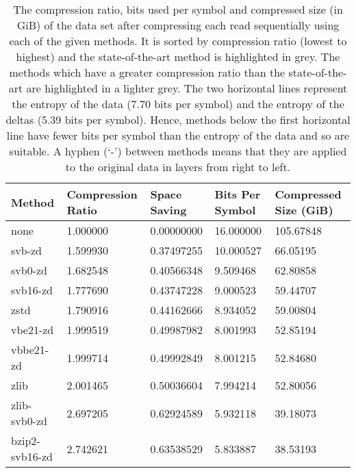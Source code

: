 \begin{table}
	\caption[The compression ratio, bits used per
	symbol and compressed size (in GiB) of the data set after compressing
	each read sequentially using each of the given methods.]{\label{tab:results-space} The compression ratio, bits used per
	symbol and compressed size (in GiB) of the data set after compressing
	each read sequentially using each of the given methods. It is
	sorted by compression ratio (lowest to highest) and the state-of-the-art method is
	highlighted in grey.
	The methods which have a greater compression ratio than the
	state-of-the-art are highlighted in a lighter grey.
	The two horizontal lines represent the entropy of
	the data (7.70 bits per symbol) and the entropy of the deltas (5.39
	bits per symbol). Hence, methods below the first horizontal line have
	fewer bits per symbol than the entropy of the data and so are suitable.
	A hyphen (`-') between methods means that they are applied to the
	original data in layers from right to left.}
	\begin{tabular}{|l|l|l|l|l|}
	    \hline
		Method & Compression Ratio & Space Saving & Bits Per Symbol & Compressed Size (GiB) \\
\hline
               none    &1.000000  & 0.00000000 &16.000000 &105.67848\\
             svb-zd    &1.599930  & 0.37497255 &10.000527 & 66.05195\\
         svb0-zd    &1.682548  & 0.40566348 & 9.509468 & 62.80858\\
           svb16-zd    &1.777690  & 0.43747228 & 9.000523 & 59.44707\\
               zstd    &1.790916  & 0.44162666 & 8.934052 & 59.00804\\
           vbe21-zd    &1.999519  & 0.49987982 & 8.001993 & 52.85194\\
          vbbe21-zd    &1.999714  & 0.49992849 & 8.001215 & 52.84680\\
               zlib    &2.001465  & 0.50036604 & 7.994214 & 52.80056\\
	       \hline
    zlib-svb0-zd    &2.697205  & 0.62924589 & 5.932118 & 39.18073\\
     bzip2-svb16-zd    &2.742621  & 0.63538529 & 5.833887 & 38.53193\\

\end{tabular}
\end{table}
